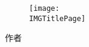 \pagecolor{brandcolor}
\color{white}
\begin{titlepage}

    \begin{figure}[ht]
    \centering
    \texttt{[image: \\IMGTitlePage]}
    \end{figure}
    
    \begin{center}
        {\Huge \textbf{\DICTDocTitle}}
    \end{center}
    
    \vfill
    
    \begin{center}
        {\Large 作者}
    \end{center}
    
    \begin{center}
        {\Large \DICTDocAuthor}
    \end{center}
    
     \begin{center}
        {\Large \DICTDocEmail}
    \end{center}
    
    \begin{center}
        {\Large \DICTDocDate}
    \end{center}
    
    \vspace{5mm}
    
\end{titlepage}
\pagecolor{white}
\color{black}
